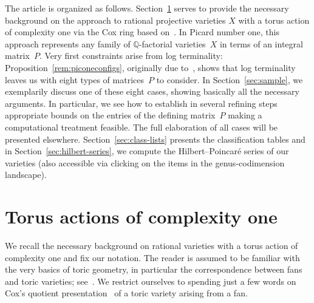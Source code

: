 \documentclass[10pt,a4paper]{amsart}
\theoremstyle{definition}
\def\QQ{{\mathbb Q}}
\numberwithin{equation}{section}
\begin{document}
The article is organized as follows.
Section~\ref{sec:tvar} serves to provide
the necessary background on the approach
to rational projective varieties $X$
with a torus action of complexity one
via the Cox ring
based on~\cite{HaHe,HaSu}.
In Picard number one, this approach
represents any family of $\QQ$-factorial
varieties~$X$ in terms of an integral
matrix~$P$.
Very first constraints arise from
log terminality:
Proposition~\ref{rem:piconeconfigs},
originally due to~\cite{BeHaHuNi},
shows that log terminality leaves us
with eight types of matrices~$P$
to consider.
In Section~\ref{sec:sample}, we exemplarily
discuss one of these eight cases,
showing basically all the necessary
arguments.
In particular, we see how to establish
in several refining steps appropriate
bounds on the entries of the defining
matrix~$P$ making a computational
treatment feasible.
The full elaboration of all cases will
be presented elsewhere.
Section~\ref{sec:class-lists} presents
the classification
tables and in Section~\ref{sec:hilbert-series},
we compute the Hilbert--Poincar\'{e} series of our
varieties (also accessible via clicking on
the items in the genus-codimension
landscape).


\section{Torus actions of complexity one}
\label{sec:tvar}

We recall the necessary background on rational
varieties with a torus action of complexity one
and fix our notation.
The reader is assumed to be familiar with the
very basics of toric geometry, in particular
the correspondence between fans and toric
varieties; see~\cite{CoLiSc,Dan,Ful}.
We restrict ourselves to spending just a few
words on Cox's quotient presentation~\cite{Cox}
of a toric variety arising from a fan.
\end{document}

